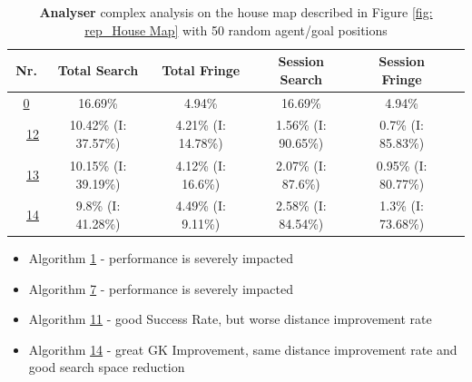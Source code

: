 \begin{table}[h!]
\bigskip

\begin{tabular}{|cc|c|c|c|c|c|}
\hline
\multicolumn{2}{|c|}{\textbf{Nr.}} & \textbf{Total Search} & \textbf{Total Fringe} & \textbf{Session Search} & \textbf{Session Fringe}\\
\hline
\hline
\multicolumn{2}{|c|}{\cellcolor{lightgray!20} \hyperref[tab: evalalgorithms]{0}} & 16.69\% & 4.94\% & 16.69\% & 4.94\%\\
\hline
\hline
\multicolumn{1}{|M{0.15cm}}{\cellcolor{cyan!40}} & \multicolumn{1}{M{0.15cm}|}{\cellcolor{blue!40} \hspace*{-0.5cm}\hyperref[tab: evalalgorithms]{12}} & 10.42\% (I: 37.57\%) & 4.21\% (I: 14.78\%) & 1.56\% (I: 90.65\%) & 0.7\% (I: 85.83\%)\\
\hline
\multicolumn{1}{|M{0.15cm}}{\cellcolor{cyan!40}} & \multicolumn{1}{M{0.15cm}|}{\cellcolor{red!40} \hspace*{-0.5cm}\hyperref[tab: evalalgorithms]{13}} & 10.15\% (I: 39.19\%) & 4.12\% (I: 16.6\%) & 2.07\% (I: 87.6\%) & 0.95\% (I: 80.77\%)\\
\hline
\multicolumn{1}{|M{0.15cm}}{\cellcolor{cyan!40}} & \multicolumn{1}{M{0.15cm}|}{\cellcolor{orange!40} \hspace*{-0.5cm}\hyperref[tab: evalalgorithms]{14}} & 9.8\% (I: 41.28\%) & 4.49\% (I: 9.11\%) & 2.58\% (I: 84.54\%) & 1.3\% (I: 73.68\%)\\
\hline
\end{tabular}


\caption{\textbf{Analyser} complex analysis on the house map described in Figure \ref{fig: rep_House Map} with 50 random agent/goal positions}
\label{tab: eval_complex_analysis_map_3} 
\end{table}

\begin{itemize}
    \item Algorithm \hyperref[tab: evalalgorithms]{1} - performance is severely impacted
    \item Algorithm \hyperref[tab: evalalgorithms]{7} - performance is severely impacted
    \item Algorithm \hyperref[tab: evalalgorithms]{11} - good Success Rate, but worse distance improvement rate
    \item Algorithm \hyperref[tab: evalalgorithms]{14} - great GK Improvement, same distance improvement rate and good search space reduction
\end{itemize}

\pagebreak